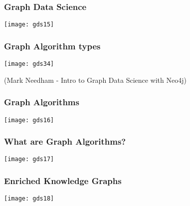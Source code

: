 \begin{frame}[fragile]\frametitle{Graph Data Science}

\begin{center}
\texttt{[image: gds15]}
\end{center}

\end{frame}

\begin{frame}[fragile]\frametitle{Graph Algorithm types}

\begin{center}
\texttt{[image: gds34]}

{\tiny (Mark Needham - Intro to Graph Data Science with Neo4j)}

\end{center}

\end{frame}


\begin{frame}[fragile]\frametitle{Graph Algorithms}

\begin{center}
\texttt{[image: gds16]}
\end{center}

\end{frame}


\begin{frame}[fragile]\frametitle{What are Graph Algorithms?}

\begin{center}
\texttt{[image: gds17]}
\end{center}

\end{frame}


\begin{frame}[fragile]\frametitle{Enriched Knowledge Graphs}

\begin{center}
\texttt{[image: gds18]}
\end{center}

\end{frame}


